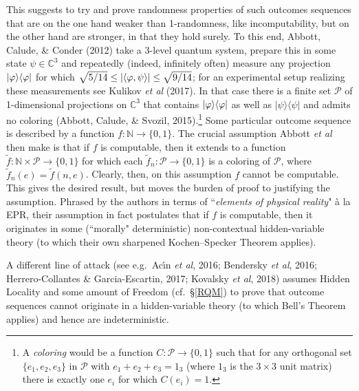 \documentclass[11pt,a4paper]{article}
\numberwithin{equation}{section}
\newcommand{\til}{\tilde}
\newcommand{\raw}{\rightarrow}
\newcommand{\la}{\langle} \newcommand{\ra}{\rangle}
\newcommand{\x}{\times}
\newcommand{\C}{{\mathbb C}}
\newcommand{\N}{{\mathbb N}} \newcommand{\R}{{\mathbb R}}
\begin{document}
This suggests to try and prove randomness properties of such outcomes sequences that are on the one hand weaker than 1-randomness, like incomputability, but on the other hand are stronger, in that they hold surely. 
To this end, Abbott,  Calude, \&  Conder (2012)  take a 3-level quantum system, prepare this in some state $\psi\in\C^3$ and repeatedly (indeed, infinitely often) measure any projection $|\phv\ra\la\phv|$ for which $\sqrt{5/14}\leq |\la\phv,\psi\ra|\leq\sqrt{9/14}$; for an experimental setup realizing these measurements see Kulikov \emph{et al} (2017). In that case there is a finite set $\mathcal{P}$ of 1-dimensional projections on $\C^3$ that contains $|\phv\ra\la\phv|$ as well as $|\psi\ra\la\psi|$ and admits no coloring (Abbott,  Calude, \& Svozil, 2015).\footnote{\label{colorfn}
A \emph{coloring} would be a function $C:\mathcal{P}\raw \{0,1\}$ such that for any orthogonal set $\{e_1,e_2,e_3\}$ in  $\mathcal{P}$ with
$e_1+e_2+e_3=1_3$ (where $1_3$ is the $3\x 3$ unit matrix) there is exactly one  $e_i$ for which $C(e_i)=1$. } Some particular outcome sequence is described by a function $f:\N\raw\{0,1\}$.
The crucial assumption  Abbott \emph{et al} then make is that if $f$ is computable, then it extends to a function
$\til{f}: \N\x\mathcal{P}\raw\{0,1\}$ for which each $\til{f}_n: \mathcal{P}\raw\{0,1\}$ is a coloring of $\mathcal{P}$, where $\til{f}_n(e)=\til{f}(n,e)$. Clearly, then, on this assumption $f$ cannot be computable. This gives the desired result, but  moves the burden of proof to justifying the assumption. Phrased by the authors in terms of ``\emph{elements of physical reality}" \`{a} la EPR, their assumption in fact postulates that if $f$ is computable, then it originates in some (``morally" deterministic) non-contextual hidden-variable theory (to which their own sharpened Kochen--Specker Theorem applies).

A different line of attack  (see e.g.\ Ac\'{\i}n  \emph{et al}, 2016; Bendersky  \emph{et al}, 2016;  Herrero-Collantes \& Garcia-Escartin, 2017;  Kovalsky \emph{et al}, 2018)
assumes Hidden Locality and some amount of Freedom (cf.\ \S\ref{RQM}) to prove that 
 outcome sequences cannot originate in a hidden-variable theory  (to which Bell's Theorem applies) and hence are indeterministic. 
\end{document}
